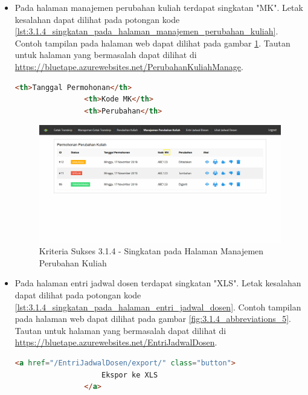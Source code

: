 \documentclass[a4paper,twoside]{article}
\begin{document}
\begin{enumerate}
\begin{itemize}
			\item Pada halaman manajemen perubahan kuliah terdapat singkatan "MK". Letak kesalahan dapat dilihat pada potongan kode \ref{lst:3.1.4_singkatan_pada_halaman_manajemen_perubahan_kuliah}. Contoh tampilan pada halaman web dapat dilihat pada gambar \ref{fig:3.1.4_abbreviations_4}. Tautan untuk halaman yang bermasalah dapat dilihat di \url{https://bluetape.azurewebsites.net/PerubahanKuliahManage}.
			\begin{lstlisting}[frame=single, label={lst:3.1.4_singkatan_pada_halaman_manajemen_perubahan_kuliah}, language=HTML, caption=Kriteria Sukses 3.1.4 - Singkatan pada Halaman Manajemen Perubahan Kuliah]
				<th>Tanggal Permohonan</th>
				<th>Kode MK</th>
				<th>Perubahan</th>
			\end{lstlisting}

			\begin{figure}[H]
				\centering  
				\includegraphics[scale=0.3, frame]{kriteria-sukses-3-1-4-abbreviations-4}  
				\caption[Kriteria Sukses 3.1.4 - Singkatan pada Halaman Manajemen Perubahan Kuliah]{Kriteria Sukses 3.1.4 - Singkatan pada Halaman Manajemen Perubahan Kuliah}
				\label{fig:3.1.4_abbreviations_4}  
			\end{figure}
			
			\item Pada halaman entri jadwal dosen terdapat singkatan "XLS". Letak kesalahan dapat dilihat pada potongan kode \ref{lst:3.1.4_singkatan_pada_halaman_entri_jadwal_dosen}. Contoh tampilan pada halaman web dapat dilihat pada gambar \ref{fig:3.1.4_abbreviations_5}. Tautan untuk halaman yang bermasalah dapat dilihat di \url{https://bluetape.azurewebsites.net/EntriJadwalDosen}.
			\begin{lstlisting}[frame=single, label={lst:3.1.4_singkatan_pada_halaman_entri_jadwal_dosen}, language=HTML, caption=Kriteria Sukses 3.1.4 - Singkatan pada Halaman Entri Jadwal Dosen]
				<a href="/EntriJadwalDosen/export/" class="button">
					Ekspor ke XLS
				</a>
			\end{lstlisting}


\end{itemize}
\end{enumerate}
\end{document}
